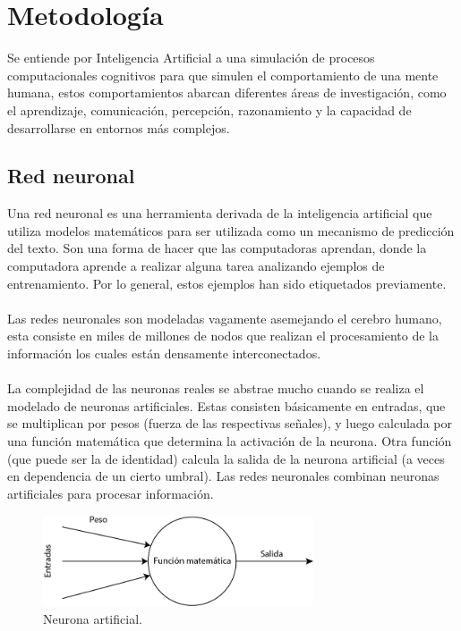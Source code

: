 \section{Metodología}
Se entiende por Inteligencia Artificial a una simulación de procesos computacionales cognitivos para que simulen el comportamiento de una mente humana, estos comportamientos abarcan diferentes áreas de investigación, como el aprendizaje, comunicación, percepción, razonamiento y la capacidad de desarrollarse en entornos más complejos.

\subsection{Red neuronal}
Una red neuronal es una herramienta derivada de la inteligencia artificial que utiliza modelos matemáticos para ser utilizada como un mecanismo de predicción del texto. Son una forma de hacer que las computadoras aprendan, donde la computadora aprende a realizar alguna tarea analizando ejemplos de entrenamiento. Por lo general, estos ejemplos han sido etiquetados previamente.\\\\
Las redes neuronales son modeladas vagamente asemejando el cerebro humano, esta consiste en miles de millones de nodos que realizan el procesamiento de la información los cuales están densamente interconectados.\\\\
La complejidad de las neuronas reales se abstrae mucho cuando se realiza el modelado de neuronas artificiales. Estas consisten básicamente en entradas, que se multiplican por pesos (fuerza de las respectivas señales), y luego calculada por una función matemática que determina la activación de la neurona. Otra función (que puede ser la de identidad) calcula la salida de la neurona artificial (a veces en dependencia de un cierto umbral). Las redes neuronales combinan neuronas artificiales para procesar información.\cite{neuronart}

\begin{figure}[h]
	\centering
	\includegraphics[width=8cm]{figuras/NeuronaArt.png}
	\caption{Neurona artificial.}
	\label{fig:Neurona artificial}
\end{figure}

